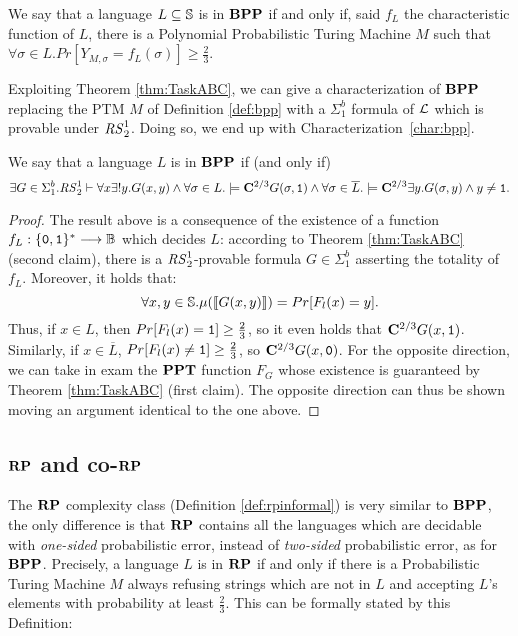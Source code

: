 \begin{defn}[$\BPP$]
\label{def:bpp}
We say that a language $L\subseteq \mathbb{S}$ is in $\BPP$ if and only if,
said $f_L$ the characteristic function of $L$, there is a
Polynomial Probabilistic Turing Machine
$M$ such that
$\forall \sigma \in L. Pr[Y_{M,\sigma} = f_L(\sigma)]\ge \frac 2 3$.
\end{defn}

Exploiting Theorem \ref{thm:TaskABC}, we can give a characterization of $\BPP$
replacing the PTM $M$ of Definition \ref{def:bpp} with a $\Sigma^b_1$
formula of $\mathcal{L}$ which is provable under ${\mathit{RS}^1_2}$.
%
Doing so, we end up with Characterization~\ref{char:bpp}.

\begin{characterization}
\label{char:bpp}
We say that a language $L$ is in $\BPP$ if (and only if)
\[
\exists G \in \Sigma^b_1.{\mathit{RS}^1_2} \vdash \forall x \exists ! y. G(x, y)\land \forall \sigma \in L.\models \mathbf{C}^{2/3} G(\sigma, \mathtt{1}) \land \forall \sigma \in \overline L.\models \mathbf{C}^{2/3} \exists y. G(\sigma, y) \land y \neq \mathtt{1}.
\]
\end{characterization}


\begin{proof}
The result above is a consequence of the existence of a function $f_L: \{\mathtt{0}, \mathtt{1}\}^*\longrightarrow \mathbb{B}$ which decides $L$:
according to Theorem \ref{thm:TaskABC} (second claim),
there is a ${\mathit{RS}^1_2}$-provable formula $G \in \Sigma^b_1$ asserting
the totality of  $f_L$. Moreover, it holds that:
$$
\forall x, y\in \mathbb{S}.\mu(\llbracket G(x, y) \rrbracket)=Pr[F_l(x)=y].
$$
Thus, if $x \in L$, then $Pr[F_l(x)=\mathtt{1}]\ge \frac 2 3$, so it even holds that
$\mathbf{C}^{2/3}G(x, \mathtt{1})$. Similarly, if $x\in \overline L$,
$Pr[F_l(x)\neq \mathtt{1}]\ge \frac 2 3$, so $\mathbf{C}^{2/3}G(x, \mathtt{0})$.
For the opposite direction, we can take in exam the $\mathbf{PPT}$ function
$F_G$ whose existence is guaranteed by Theorem \ref{thm:TaskABC} (first claim).
The opposite direction can thus be shown moving an argument identical to the one above.
\end{proof}

\subsection{$\mathbf{RP}$ and co-$\mathbf{RP}$}

The $\mathbf{RP}$ complexity class (Definition \ref{def:rpinformal}) is very similar to
$\BPP$, the only difference is that $\mathbf{RP}$ contains all the languages which are decidable with
\emph{one-sided} probabilistic error, instead of \emph{two-sided} probabilistic error, as for $\BPP$.
Precisely, a language $L$ is in $\mathbf{RP}$
if and only if there is a Probabilistic Turing Machine $M$ always refusing strings which are not
in $L$ and accepting $L$'s elements with probability at least $\frac 2 3$.
%
This can be formally stated by this Definition:

